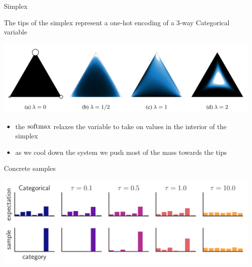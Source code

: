 \begin{frame}{Simplex}

The tips of the simplex represent a one-hot encoding of a 3-way Categorical variable

\begin{center}
\includegraphics[scale=0.25]{img/simplex}
\end{center}

\begin{itemize}
	\item the $\operatorname{softmax}$ relaxes the variable to take on values in the interior of the simplex
	\item as we cool down the system we push most of the mass towards the tips
\end{itemize}


\end{frame}


\begin{frame}{Concrete samples}

\begin{center}
\includegraphics[scale=0.25]{img/bars}
\end{center}



\end{frame}



